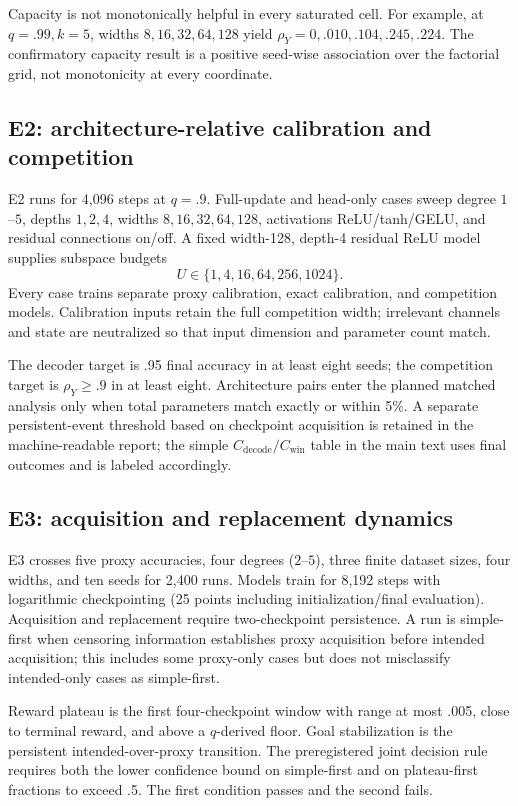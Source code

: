 \documentclass[11pt,a4paper]{article}
\newcommand{\rhoY}{\rho_Y}
\begin{document}
Capacity is not monotonically helpful in every saturated cell. For example, at $q=.99,k=5$, widths $8,16,32,64,128$ yield $\rhoY=0,.010,.104,.245,.224$. The confirmatory capacity result is a positive seed-wise association over the factorial grid, not monotonicity at every coordinate.

\subsection{E2: architecture-relative calibration and competition}

E2 runs for 4,096 steps at $q=.9$. Full-update and head-only cases sweep degree $1$--$5$, depths $1,2,4$, widths $8,16,32,64,128$, activations ReLU/tanh/GELU, and residual connections on/off. A fixed width-128, depth-4 residual ReLU model supplies subspace budgets
\[
U\in\{1,4,16,64,256,1024\}.
\]
Every case trains separate proxy calibration, exact calibration, and competition models. Calibration inputs retain the full competition width; irrelevant channels and state are neutralized so that input dimension and parameter count match.

The decoder target is .95 final accuracy in at least eight seeds; the competition target is $\rhoY\geq.9$ in at least eight. Architecture pairs enter the planned matched analysis only when total parameters match exactly or within 5\%. A separate persistent-event threshold based on checkpoint acquisition is retained in the machine-readable report; the simple $C_{\mathrm{decode}}/C_{\mathrm{win}}$ table in the main text uses final outcomes and is labeled accordingly.

\subsection{E3: acquisition and replacement dynamics}

E3 crosses five proxy accuracies, four degrees ($2$--$5$), three finite dataset sizes, four widths, and ten seeds for 2,400 runs. Models train for 8,192 steps with logarithmic checkpointing (25 points including initialization/final evaluation). Acquisition and replacement require two-checkpoint persistence. A run is simple-first when censoring information establishes proxy acquisition before intended acquisition; this includes some proxy-only cases but does not misclassify intended-only cases as simple-first.

Reward plateau is the first four-checkpoint window with range at most .005, close to terminal reward, and above a $q$-derived floor. Goal stabilization is the persistent intended-over-proxy transition. The preregistered joint decision rule requires both the lower confidence bound on simple-first and on plateau-first fractions to exceed .5. The first condition passes and the second fails.
\end{document}
